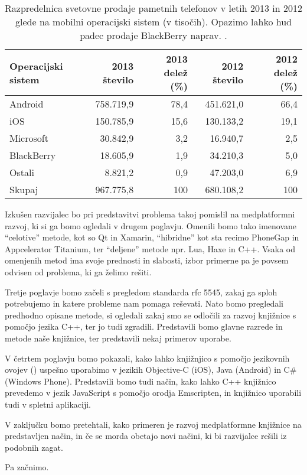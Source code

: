 \begin{table}
\begin{tabular}{ l | r | r | r | r }
  \hline
  Operacijski sistem & 2013 število & 2013 delež (\%) & 2012 število & 2012 delež (\%) \\
  \hline
  Android		& 758.719,9 & 78,4 & 451.621,0 & 66,4 \\
  iOS			& 150.785,9 & 15,6 & 130.133,2 & 19,1 \\
  Microsoft		& 30.842,9  & 3,2  & 16.940,7  & 2,5  \\
  BlackBerry	& 18.605,9  & 1,9  & 34.210,3  & 5,0  \\
  Ostali		& 8.821,2   & 0,9  & 47.203,0  & 6,9  \\
  \hline
  Skupaj		& 967.775,8 & 100  & 680.108,2 & 100  \\
  \hline
\end{tabular}
\caption{Razpredelnica svetovne prodaje pametnih telefonov v letih 2013 in 2012 glede na mobilni operacijski sistem (v tisočih). Opazimo lahko hud padec prodaje BlackBerry naprav. \cite{gartner-mobile-numbers}.}
\label{table:prodaja-mobilnih-naprav}
\end{table}

Izkušen razvijalec bo pri predstavitvi problema takoj pomislil na medplatformni razvoj, ki si ga bomo ogledali v drugem poglavju. Omenili bomo tako imenovane ``celotive'' metode, kot so Qt\cite{qt} in Xamarin\cite{xamarin}, ``hibridne'' kot sta recimo PhoneGap\cite{phonegap} in Appcelerator Titanium\cite{titanium}, ter ``deljene'' metode npr. Lua\cite{lua}, Haxe\cite{haxe} in C++\cite{cpp}. Vsaka od omenjenih metod ima svoje prednosti in slabosti, izbor primerne pa je povsem odvisen od problema, ki ga želimo rešiti.

Tretje poglavje bomo začeli s pregledom standarda \gls{rfc} 5545\cite{rfc5545}, zakaj ga sploh potrebujemo in katere probleme nam pomaga reševati. Nato bomo pregledali predhodno opisane metode, si ogledali zakaj smo se odločili za razvoj knjižnice s pomočjo jezika C++, ter jo tudi zgradili. Predstavili bomo glavne razrede in metode naše knjižnice, ter predstavili nekaj primerov uporabe.

V četrtem poglavju bomo pokazali, kako lahko knjižnjico s pomočjo jezikovnih ovojev () uspešno uporabimo v jezikih Objective-C (iOS), Java (Android) in C\# (Windows Phone). Predstavili bomo tudi način, kako lahko C++ knjižnico prevedemo v jezik JavaScript s pomočjo orodja Emscripten\cite{emscripten}, in knjižnico uporabili tudi v spletni aplikaciji.

V zaključku bomo pretehtali, kako primeren je razvoj medplatformne knjižnice na predstavljen način, in če se morda obetajo novi načini, ki bi razvijalce rešili iz podobnih zagat.

Pa začnimo.
